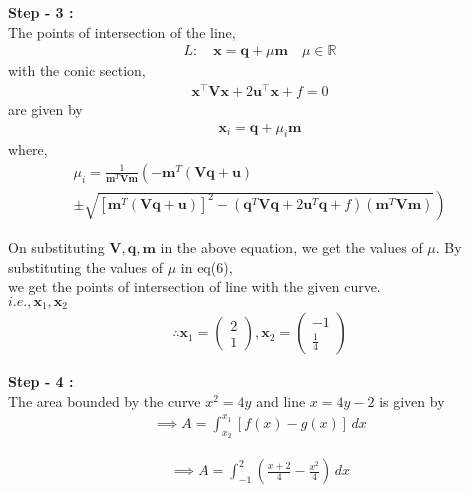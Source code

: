 \documentclass[10pt,a4paper]{report}
\newcommand{\myvec}[1]{\ensuremath{\begin{pmatrix}#1\end{pmatrix}}}
\let\vec\mathbf
\providecommand{\brak}[1]{\ensuremath{\left(#1\right)}}
\providecommand{\lbrak}[1]{\ensuremath{\left(#1\right.}}
\providecommand{\rbrak}[1]{\ensuremath{\left.#1\right)}}
\providecommand{\sbrak}[1]{\ensuremath{{}\left[#1\right]}}
\begin{document}
\begin{multicols}{2}
\raggedright \textbf{Step - 3 :}\\ \vspace{2mm}
The points of intersection of the line, \\ 
\begin{align}
L: \quad \vec{x} = \vec{q} + \mu \vec{m} \quad \mu \in \mathbb{R}
\end{align}
with the conic section, \\ 
\begin{align}
	\vec{x}^{\top}\vec{V}\vec{x} + 2\vec{u}^{\top} \vec{x} + f = 0
\end{align}
are given by \\
\begin{align}
\vec{x}_i = \vec{q} + \mu_i \vec{m}
\end{align}
where, \\
{\tiny
\begin{multline}
\mu_i = \frac{1}
{
\vec{m}^T\vec{V}\vec{m}
}
\lbrak{-\vec{m}^T\brak{\vec{V}\vec{q}+\vec{u}}}
\\
\pm
\rbrak{\sqrt{
\sbrak{
\vec{m}^T\brak{\vec{V}\vec{q}+\vec{u}}
}^2
-
\brak
{
\vec{q}^T\vec{V}\vec{q} + 2\vec{u}^T\vec{q} +f
}
\brak{\vec{m}^T\vec{V}\vec{m}}
}
}
\end{multline}
}
\raggedright On substituting $\vec{V},\vec{q} ,\vec{m}$ in the above equation,
we get the values of $\mu$. By substituting the values of $\mu$ in eq(6), \\we get the points of intersection of line with the given curve. \\
\centering $i.e., \vec{x}_1,\vec{x}_2$\\ 

\begin{align}
\therefore \vec{x}_1=\myvec{2\\1} , \vec{x}_2=\myvec{-1\\ \frac{1}{4}}
\end{align}

\raggedright \textbf{Step - 4 :}\\ \vspace{2mm}
The area bounded by the curve $x^2=4y$ and line $x=4y-2$ is given by\\

\begin{align}
\implies A=\int_{x_2}^{x_1} [f(x)-g(x)] \,dx
\end{align}

\begin{align}
\implies A=\int_{-1}^{2} (\frac{x+2}{4}-\frac{x^2}{4}) \,dx
\end{align}


\end{multicols}
\end{document}
